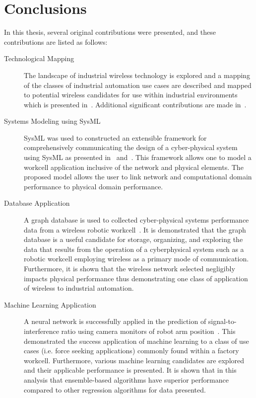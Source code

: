 
\chapter{Conclusions}

In this thesis, several original contributions were presented, and these contributions are listed as follows:

\begin{description}
	\item[Technological Mapping] The landscape of industrial wireless technology is explored and a mapping of the classes of industrial automation use cases are described and mapped to potential wireless candidates for use within industrial environments which is presented in~\cite{CandellRW2017}.  Additional significant contributions are made in~\cite{Candell2018.IWSGuide, Candell2017.SAS.IWSWorkshopReport, Montgomery2019}.
	
	\item[Systems Modeling using SysML] SysML was used to constructed an extensible framework for comprehensively communicating the design of a cyber-physical system using SysML as presented in~\cite{Candell2019ASR.SYSML} and~\cite{Candell2018SysML.DATA}.  This framework allows one to model a workcell application inclusive of the network and physical elements.  The proposed model allows the user to link network and computational domain performance to physical domain performance.
	
	\item[Database Application] A graph database is used to collected cyber-physical systems performance data from a wireless robotic workcell~\cite{CandellISIT2020.Conf}.  It is demonstrated that the graph database is a useful candidate for storage, organizing, and exploring the data that results from the operation of a cyberphysical system such as a robotic workcell employing wireless as a primary mode of communication.  Furthermore, it is shown that the wireless network selected negligibly impacts physical performance thus demonstrating one class of application of wireless to industrial automation.
	
	\item[Machine Learning Application] A neural network is successfully applied in the prediction of signal-to-interference ratio using camera monitors of robot arm position~\cite{CandellISIE2019.Conf, Candell2020.Jrnl.Access}.  This demonstrated the success application of machine learning to a class of use cases (i.e. force seeking applications) commonly found within a factory workcell.  Furthermore, various machine learning candidates are explored and their applicable performance is presented.  It is shown that in this analysis that ensemble-based algorithms have superior performance compared to other regression algorithms for data presented.  
\end{description}

